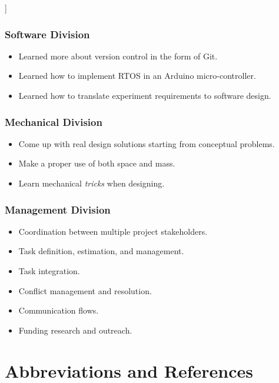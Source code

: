 ]\documentclass[a4paper,12pt,twoside]{article}
\begin{document}
\subsubsection{Software Division}

\begin{itemize}
    \item Learned more about version control in the form of Git.
    \item Learned how to implement RTOS in an Arduino micro-controller.
    \item Learned how to translate experiment requirements to software design.
\end{itemize}


\subsubsection{Mechanical Division}

\begin{itemize}
    \item Come up with real design solutions starting from conceptual problems.
    \item Make a proper use of both space and mass.
    \item Learn mechanical \textit{tricks} when designing. 

\end{itemize}


\subsubsection{Management Division}

\begin{itemize}
    \item Coordination between multiple project stakeholders.
    \item Task definition, estimation, and management.
    \item Task integration.
    \item Conflict management and resolution.
    \item Communication flows.
    \item Funding research and outreach.
\end{itemize}
\pagebreak
\section{Abbreviations and References}
\end{document}
